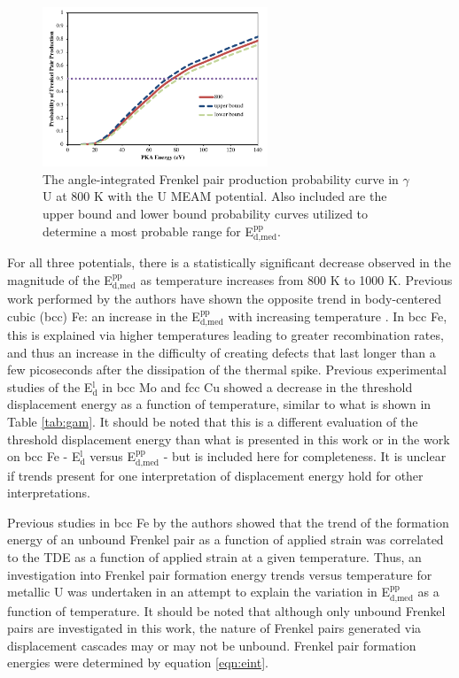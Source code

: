 \documentclass[review]{elsarticle}
\begin{document}
\begin{figure}[h]
 \centering
 \includegraphics[width=0.6\textwidth]{plus_minus.png} 
 \caption{The angle-integrated Frenkel pair production probability curve in $\gamma$U at 800 K with the U MEAM potential. Also included are the upper bound and lower bound probability curves utilized to determine a most probable range for E$^{\textrm{pp}}_{\textrm{d,med}}$.}
 \label{fig:errs}
\end{figure}



\FloatBarrier

For all three potentials, there is a statistically significant decrease observed in the magnitude of the E$^{\textrm{pp}}_{\textrm{d,med}}$ as temperature increases from 800 K to 1000 K. Previous work performed by the authors have shown the opposite trend in body-centered cubic (bcc) Fe: an increase in the E$^{\textrm{pp}}_{\textrm{d,med}}$ with increasing temperature \cite{beeler2016}. In bcc Fe, this is explained via higher temperatures leading to greater recombination rates, and thus an increase in the difficulty of creating defects that last longer than a few picoseconds after the dissipation of the thermal spike. Previous experimental studies of the E$^{\textrm{l}}_{\textrm{d}}$ in bcc Mo \cite{zag1983} and fcc Cu\cite{yoshida1979} showed a decrease in the threshold displacement energy as a function of temperature, similar to what is shown in Table \ref{tab:gam}. It should be noted that this is a different evaluation of the threshold displacement energy than what is presented in this work or in the work on bcc Fe \cite{beeler2016}- E$^{\textrm{l}}_{\textrm{d}}$ versus E$^{\textrm{pp}}_{\textrm{d,med}}$ - but is included here for completeness. It is unclear if trends present for one interpretation of displacement energy hold for other interpretations. 

Previous studies in bcc Fe \cite{beeler2015, beeler2016} by the authors showed that the trend of the formation energy of an unbound Frenkel pair as a function of applied strain was correlated to the TDE as a function of applied strain at a given temperature. Thus, an investigation into Frenkel pair formation energy trends versus temperature for metallic U was undertaken in an attempt to explain the variation in E$^{\textrm{pp}}_{\textrm{d,med}}$ as a function of temperature. It should be noted that although only unbound Frenkel pairs are investigated in this work, the nature of Frenkel pairs generated via displacement cascades may or may not be unbound. Frenkel pair formation energies were determined by equation \ref{eqn:eint}.
\end{document}
